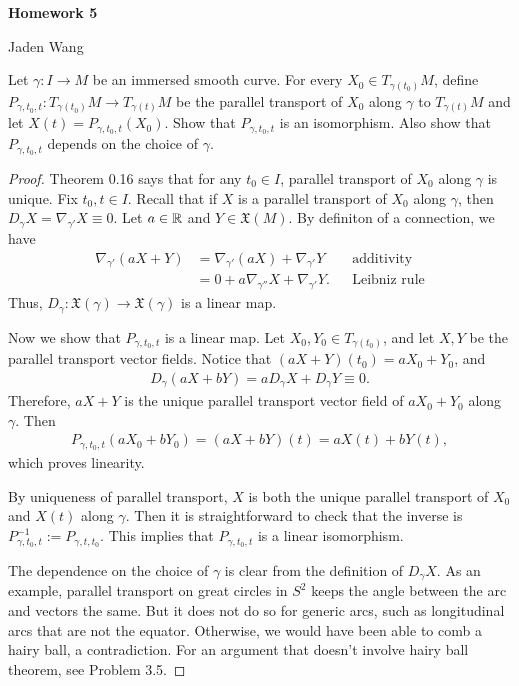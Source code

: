 \documentclass[12pt]{article}
\begin{document}
\centerline {\textsf{\textbf{\LARGE{Homework 5}}}}
\centerline {Jaden Wang}
\vspace{.15in}
\begin{problem}[LN14 0.17]
Let $ \gamma: I \to M$ be an immersed smooth curve. For every $ X_0 \in T_{ \gamma(t_0)} M$, define $ P_{ \gamma, t_0, t} : T_{ \gamma(t_0) } M \to T_{ \gamma(t)} M$ be the parallel transport of $ X_0$ along $ \gamma$ to $ T_{ \gamma(t)}M$ and let $ X(t) = P_{\gamma, t_0, t}(X_0)$. Show that $ P_{ \gamma,t_0,t}$ is an isomorphism. Also show that $ P_{ \gamma, t_0, t}$ depends on the choice of $ \gamma$.
\end{problem}
\begin{proof}
Theorem 0.16 says that for any $ t_0 \in I$, parallel transport of $ X_0$ along $ \gamma$ is unique. Fix $ t_0,t \in I$. Recall that if $ X$ is a parallel transport of  $ X_0$ along $ \gamma$, then $ D_{ \gamma} X = \nabla _{ \gamma'} X \equiv 0$. Let $ a \in \mathbb{R}$ and $ Y \in \mathfrak{X}(M)$. By definiton of a connection, we have 
\begin{align*}
	\nabla_{ \gamma'} (a X+Y) &= \nabla _{ \gamma'} (a X) + \nabla _{ \gamma'} Y && \text{additivity}  \\
							  &= 0 + a \nabla _{ \gamma''}X + \nabla _{ \gamma'} Y. && \text{Leibniz rule} 
\end{align*}
Thus, $ D_{ \gamma}: \mathfrak{X}( \gamma) \to \mathfrak{X}( \gamma) $ is a linear map.  

Now we show that $ P_{\gamma, t_0, t}$ is a linear map. Let $ X_0,Y_0 \in T_{ \gamma(t_0)}$, and let $ X,Y$ be the parallel transport vector fields. Notice that $ (aX+Y)(t_0) = aX_0 + Y_0$, and
\begin{align*}
	D_{ \gamma}(aX+bY) = a D_{ \gamma}X +  D_{ \gamma}Y \equiv 0.  
\end{align*}
Therefore, $ aX+Y$ is the unique parallel transport vector field of  $ aX_0 + Y_0$ along $ \gamma$. Then
\begin{align*}
	P_{\gamma, t_0, t}(aX_0+bY_0) = (aX+bY)(t) = aX(t)+bY(t),
\end{align*}
which proves linearity.
 
By uniqueness of parallel transport, $ X$ is both the unique parallel transport of $ X_0$ and $ X(t)$ along  $ \gamma$. Then it is straightforward to check that the inverse is $ P_{\gamma, t_0, t}^{-1} := P_{\gamma, t, t_0}$. This implies that $ P_{\gamma, t_0, t}$ is a linear isomorphism.

The dependence on the choice of $ \gamma$ is clear from the definition of $ D_{ \gamma} X$. As an example, parallel transport on great circles in $ S^2$ keeps the angle between the arc and vectors the same. But it does not do so for generic arcs, such as longitudinal arcs that are not the equator. Otherwise, we would have been able to comb a hairy ball, a contradiction. For an argument that doesn't involve hairy ball theorem, see Problem 3.5.
\end{proof}
\end{document}
